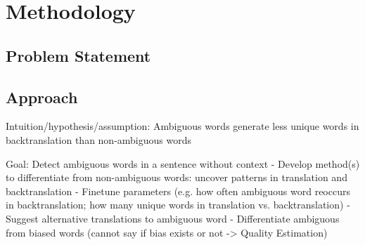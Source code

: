 \chapter{Methodology}
\label{ch:Methodology}

\section{Problem Statement}
\label{sec:Methodology:Problem}

\section{Approach}
\label{sec:Methodology:Approach}


Intuition/hypothesis/assumption: Ambiguous words generate less unique words in backtranslation than non-ambiguous words



Goal: Detect ambiguous words in a sentence without context
	- Develop method(s) to differentiate from non-ambiguous words: uncover patterns in translation and backtranslation
	- Finetune parameters (e.g. how often ambiguous word reoccurs in backtranslation; how many unique words in translation vs. backtranslation)
	- Suggest alternative translations to ambiguous word
    - Differentiate ambiguous from biased words (cannot say if bias exists or not -> Quality Estimation)

